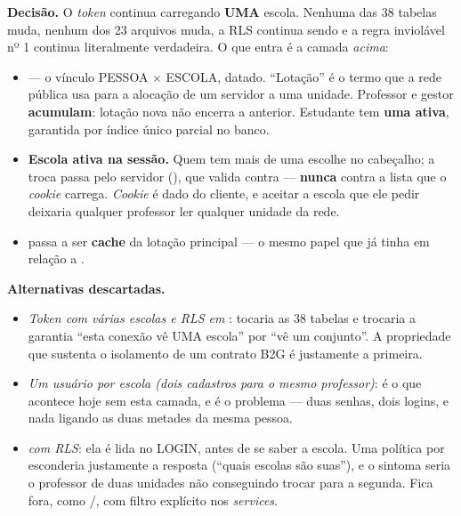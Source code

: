 \textbf{Decisão.} O \emph{token} continua carregando \textbf{UMA} escola. Nenhuma
das 38 tabelas muda, nenhum dos 23 arquivos muda, a RLS continua sendo
 e a regra inviolável nº 1
continua literalmente verdadeira. O que entra é a camada \emph{acima}:

\begin{itemize}
  \item {} --- o vínculo PESSOA $\times$ ESCOLA, datado.
    \enquote{Lotação} é o termo que a rede pública usa para a alocação de um
    servidor a uma unidade. Professor e gestor \textbf{acumulam}: lotação nova não
    encerra a anterior. Estudante tem \textbf{uma ativa}, garantida por índice único
    parcial no banco.
  \item \textbf{Escola ativa na sessão.} Quem tem mais de uma escolhe no
    cabeçalho; a troca passa pelo servidor (), que
    valida contra  --- \textbf{nunca} contra a lista que
    o \emph{cookie} carrega. \emph{Cookie} é dado do cliente, e aceitar a escola
    que ele pedir deixaria qualquer professor ler qualquer unidade da rede.
  \item {} passa a ser \textbf{cache} da lotação principal ---
    o mesmo papel que  já tinha em relação a .
\end{itemize}

\textbf{Alternativas descartadas.}
\begin{itemize}
  \item \emph{\emph{Token} com várias escolas e RLS em }: tocaria
    as 38 tabelas e trocaria a garantia \enquote{esta conexão vê UMA escola} por
    \enquote{vê um conjunto}. A propriedade que sustenta o isolamento de um
    contrato B2G é justamente a primeira.
  \item \emph{Um usuário por escola (dois cadastros para o mesmo professor)}: é o
    que acontece hoje sem esta camada, e é o problema --- duas senhas, dois
    logins, e nada ligando as duas metades da mesma pessoa.
  \item \emph{ com RLS}: ela é lida no LOGIN, antes de se saber a
    escola. Uma política por  esconderia justamente a resposta
    (\enquote{quais escolas são suas}), e o sintoma seria o professor de duas
    unidades não conseguindo trocar para a segunda. Fica fora, como
    /, com filtro explícito nos \emph{services}.
\end{itemize}


